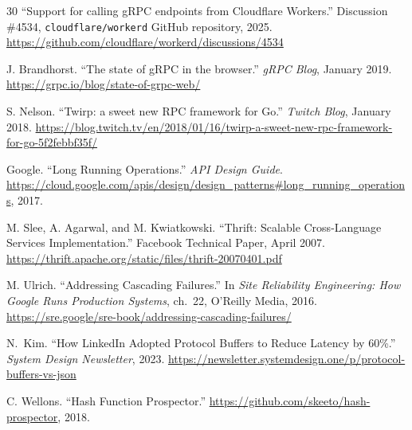 \documentclass[10pt,onecolumn]{article}
\begin{document}
\begin{thebibliography}{30}
``Support for calling gRPC endpoints from Cloudflare Workers.'' Discussion \#4534, \texttt{cloudflare/workerd} GitHub repository, 2025. \url{https://github.com/cloudflare/workerd/discussions/4534}

J. Brandhorst. ``The state of gRPC in the browser.'' \textit{gRPC Blog}, January 2019. \url{https://grpc.io/blog/state-of-grpc-web/}

S. Nelson. ``Twirp: a sweet new RPC framework for Go.'' \textit{Twitch Blog}, January 2018. \url{https://blog.twitch.tv/en/2018/01/16/twirp-a-sweet-new-rpc-framework-for-go-5f2febbf35f/}

Google. ``Long Running Operations.'' \textit{API Design Guide}. \url{https://cloud.google.com/apis/design/design_patterns#long_running_operations}, 2017.

M. Slee, A. Agarwal, and M. Kwiatkowski. ``Thrift: Scalable Cross-Language Services Implementation.'' Facebook Technical Paper, April 2007. \url{https://thrift.apache.org/static/files/thrift-20070401.pdf}

M. Ulrich. ``Addressing Cascading Failures.'' In \textit{Site Reliability Engineering: How Google Runs Production Systems}, ch.~22, O'Reilly Media, 2016. \url{https://sre.google/sre-book/addressing-cascading-failures/}


N.~Kim. ``How LinkedIn Adopted Protocol Buffers to Reduce Latency by 60\%.'' \textit{System Design Newsletter}, 2023. \url{https://newsletter.systemdesign.one/p/protocol-buffers-vs-json}

C. Wellons. ``Hash Function Prospector.'' \url{https://github.com/skeeto/hash-prospector}, 2018.

\end{thebibliography}
\end{document}
